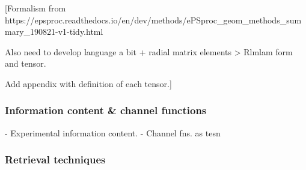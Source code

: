 [Formalism from https://epsproc.readthedocs.io/en/dev/methods/ePSproc_geom_methods_summary_190821-v1-tidy.html

Also need to develop language a bit + radial matrix elements > Rlmlam form and tensor.

Add appendix with definition of each tensor.]

\subsubsection{Information content \& channel functions}

- Experimental information content.
- Channel fns. as tesn

\subsubsection{Retrieval techniques}
